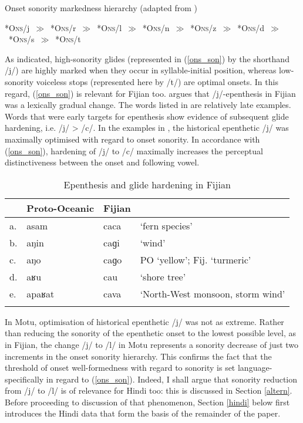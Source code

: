 \documentclass[output=paper,colorlinks,citecolor=brown]{langscibook}
\begin{document}
\ea \label{ons_son}
Onset sonority markedness hierarchy (adapted from \citealt[84]{Gopal2018})\\\relax

{\small \mbox{*O\textsc{ns}/j $\gg$ *O\textsc{ns}/r $\gg$ *O\textsc{ns}/l $\gg$ *O\textsc{ns}/n $\gg$ *O\textsc{ns}/z $\gg$ *O\textsc{ns}/d $\gg$ *O\textsc{ns}/s $\gg$ *O\textsc{ns}/t}}
\z

As indicated, high-sonority glides (represented in (\ref{ons_son}) by the shorthand /j/) are highly marked when they occur in syllable-initial position, whereas low-sonority voiceless stops (represented here by /t/) are optimal onsets.  In this regard, (\ref{ons_son}) is relevant for Fijian too.  \citet[10--11]{Blust1999} argues that /j/-epenthesis in Fijian was a lexically gradual change.  The words listed in  are relatively late examples.  Words that were early targets for epenthesis show evidence of subsequent glide hardening, i.e. /j/ > /c/.  In the examples in , the historical epenthetic /j/ was maximally optimised with regard to onset sonority.  In accordance with (\ref{ons_son}), hardening of /j/ to /c/ maximally increases the perceptual distinctiveness between the onset and following vowel.

\begin{table}
\caption{Epenthesis and glide hardening in Fijian}
\label{ep_fij}
\begin{tabularx}{\textwidth}{lXXl}
\lsptoprule
   & {Proto-Oceanic} & {Fijian} & \\
   \midrule
a. & asam & caca & `fern species' \\
b. & aŋin & caɡi & `wind' \\
c. & aŋo & caɡo & PO `yellow'; Fij. `turmeric' \\
d. & aʁu & cau & `shore tree' \\
e. & apaʁat & cava & `North-West monsoon, storm wind' \\
\lspbottomrule
\end{tabularx}
\end{table}

In Motu, optimisation of historical epenthetic /j/ was not as extreme.  Rather than reducing the sonority of the epenthetic onset to the lowest possible level, as in Fijian, the change /j/ to /l/ in Motu represents a sonority decrease of just two increments in the onset sonority hierarchy.  This confirms the fact that the threshold of onset well-formedness with regard to sonority is set language-specifically in regard to (\ref{ons_son}).  Indeed, I shall argue that sonority reduction from /j/ to /l/ is of relevance for Hindi too: this is discussed in Section \ref{altern}.  Before proceeding to discussion of that phenomenon, Section \ref{hindi} below first introduces the Hindi data that form the basis of the remainder of the paper.
\end{document}
